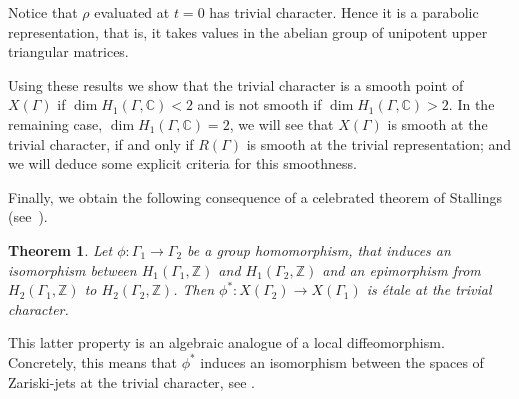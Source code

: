 \documentclass[JEP,XML,SOM,Unicode,NoEqCountersInSection]{cedram}
\newtheorem{theorem}{Theorem}[section]
\theoremstyle{definition}
\newcommand{\ZZ}{\mathbb{Z}}
\newcommand{\CC}{\mathbb{C}}
\begin{document}
Notice that $\rho$ evaluated at $t=0$ has trivial character. Hence it is a parabolic representation, that is, it takes values in the abelian group of unipotent upper triangular matrices.

Using these results we show that the trivial character is a smooth
point of $X(\Gamma)$ if $\dim H_1(\Gamma,\CC)<2$ and is not smooth
if $\dim H_1(\Gamma,\CC)>2$. In the remaining case, $\dim H_1(\Gamma,\CC)=2$,
we will see that $X(\Gamma)$ is smooth at the trivial character, if and only
if $R(\Gamma)$ is smooth at the trivial representation; and we will deduce
some explicit criteria for this smoothness.

Finally, we obtain the following consequence of a
celebrated theorem of Stallings (see~\cite{Stallings}).
\begin{theorem}\label{theo:etale}
Let $\phi\colon \Gamma_1\to \Gamma_2$ be a group homomorphism, that
induces an isomorphism between $H_1(\Gamma_1,\ZZ)$ and $H_1(\Gamma_2,\ZZ)$
and an epimorphism from $H_2(\Gamma_1,\ZZ)$ to $H_2(\Gamma_2,\ZZ)$. Then
$\phi^*\colon X(\Gamma_2)\to X(\Gamma_1)$ is étale at the trivial
character.
\end{theorem}
This latter property is an algebraic analogue of a local diffeomorphism.
Concretely, this means that $\phi^*$ induces an isomorphism between the
spaces of Zariski-jets at the trivial character,
see \eg \cite[Chap.\,4, Prop.\,3.26]{Liu}.
\end{document}
